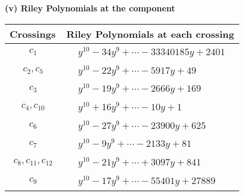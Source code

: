\documentclass[1p]{elsarticle_modified}
\theoremstyle{definition}
\begin{document}
\newpage\renewcommand{\arraystretch}{1}
\flushleft \textbf{(v) Riley Polynomials at the component}\newline \\
\begin{tabular}{m{50pt}|m{274pt}}
Crossings & \hspace{64pt}Riley Polynomials at each crossing \\
\hline $$\begin{aligned}c_{1}\end{aligned}$$&$\begin{aligned}
&y^{10}-34 y^9+\cdots-33340185 y+2401
\end{aligned}$\\
\hline $$\begin{aligned}c_{2},c_{5}\end{aligned}$$&$\begin{aligned}
&y^{10}-22 y^9+\cdots-5917 y+49
\end{aligned}$\\
\hline $$\begin{aligned}c_{3}\end{aligned}$$&$\begin{aligned}
&y^{10}-19 y^9+\cdots-2666 y+169
\end{aligned}$\\
\hline $$\begin{aligned}c_{4},c_{10}\end{aligned}$$&$\begin{aligned}
&y^{10}+16 y^9+\cdots-10 y+1
\end{aligned}$\\
\hline $$\begin{aligned}c_{6}\end{aligned}$$&$\begin{aligned}
&y^{10}-27 y^9+\cdots-23900 y+625
\end{aligned}$\\
\hline $$\begin{aligned}c_{7}\end{aligned}$$&$\begin{aligned}
&y^{10}-9 y^9+\cdots-2133 y+81
\end{aligned}$\\
\hline $$\begin{aligned}c_{8},c_{11},c_{12}\end{aligned}$$&$\begin{aligned}
&y^{10}-21 y^9+\cdots+3097 y+841
\end{aligned}$\\
\hline $$\begin{aligned}c_{9}\end{aligned}$$&$\begin{aligned}
&y^{10}-17 y^9+\cdots-55401 y+27889
\end{aligned}$\\
\hline
\end{tabular}\\~\\
\end{document}
